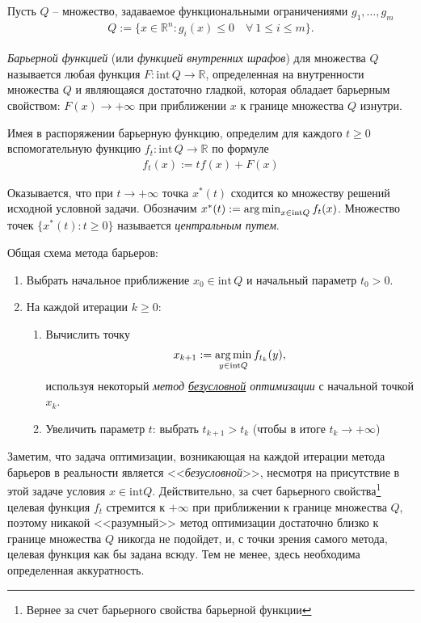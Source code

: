 \documentclass[%
	11pt,
	a4paper,
	utf8,
		]{article}
\begin{document}
Пусть $ Q $ -- множество, задаваемое функциональными ограничениями $ g_1, \ldots, g_m $
\begin{align*}
	Q := \{ x \in \mathbb{R}^n: g_i (x) \leqslant 0 \quad \forall \ 1 \leqslant i \leqslant m \}.
\end{align*}

\emph{Барьерной функцией} (или \emph{функцией внутренних шрафов}) для множества $ Q $ называется любая функция $ F: \text{int} \, Q \rightarrow \mathbb{R} $, определенная на внутренности множества $ Q $ и являющаяся достаточно гладкой, которая обладает барьерным свойством: $ F(x) \rightarrow + \infty $ при приближении $ x $ к границе множества $ Q $ изнутри.

Имея в распоряжении барьерную функцию, определим для каждого $ t \geqslant 0 $ вспомогательную функцию $ f_t: \text{int} \, Q \rightarrow \mathbb{R} $ по формуле
\begin{align*}
	f_t(x) := t f(x) + F(x)
\end{align*}

Оказывается, что при $ t \rightarrow + \infty $ точка $ x^{*}(t) $ сходится ко множеству решений исходной условной задачи. Обозначим $ x^{*}(t) := \operatorname*{arg\,min}_{ x \in \text{int} Q } f_t(x) $. Множество точек $ \{ x^{*}(t): t \geqslant 0 \} $ называется \emph{центральным путем}.

{\color{blue}Общая схема метода барьеров}:
\begin{enumerate}
	\item Выбрать начальное приближение $ x_0 \in \text{int} \, Q $ и начальный параметр $ t_0 > 0 $.
	
	\item На каждой итерации $ k \geqslant 0 $:
	\begin{enumerate}
		\item Вычислить точку 
\begin{align*}
x_{k+1} := \operatorname*{arg\,min}_{ y \in \text{int} Q } f_{t_k} (y),
\end{align*}
    используя некоторый \emph{метод \underline{безусловной} оптимизации} с начальной точкой $ x_k $.
    
    \item Увеличить параметр $ t $: выбрать $ t_{k+1} > t_k $ (чтобы в итоге $ t_k \rightarrow + \infty $)
	\end{enumerate}
\end{enumerate}

Заметим, что задача оптимизации, возникающая на каждой итерации метода барьеров в реальности является <<\emph{безусловной}>>, несмотря на присутствие в этой задаче условия $ x \in \text{int} Q $. Действительно, за счет барьерного свойства\footnote{Вернее за счет барьерного свойства барьерной функции} целевая функция $ f_t $ стремится к $ + \infty $ при приближении к границе множества $ Q $, поэтому никакой <<разумный>> метод оптимизации достаточно близко к границе множества $ Q $ никогда не подойдет, и, с точки зрения самого метода, целевая функция как бы задана всюду. Тем не менее, здесь необходима определенная аккуратность.
\end{document}
